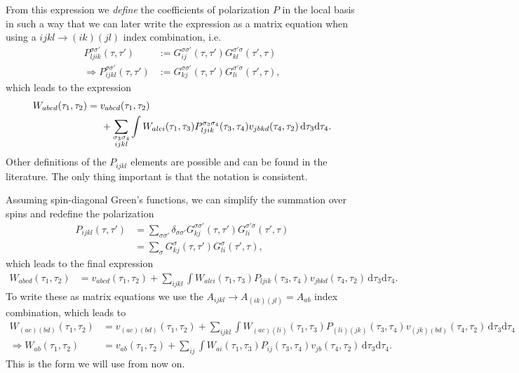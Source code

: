 \documentclass[12pt,a4paper]{scrartcl}
\numberwithin{equation}{section}
\begin{document}
From this expression we \textit{define} the coefficients of  polarization $P$ in
the local basis in such a way that we can later write the expression as a matrix
equation when using a $ijkl\rightarrow (ik)(jl)$ index combination, i.e.
\begin{align}
 P^{\sigma\sigma'}_{ljik}(\tau,\tau') 
 &:= G^{\sigma\sigma'}_{ij}(\tau,\tau') G^{\sigma'\sigma}_{kl}(\tau',\tau) \\
 \Rightarrow
 P^{\sigma\sigma'}_{ijkl}(\tau,\tau') 
 &:= G^{\sigma\sigma'}_{kj}(\tau,\tau') G^{\sigma'\sigma}_{li}(\tau',\tau) ,
\end{align}
which leads to the expression
\begin{align}
W_{abcd}(\tau_1,\tau_2) 
%
&= v_{abcd}(\tau_1,\tau_2)  \nonumber \\ 
& \hspace{0.5cm}  + \sum_{\substack{\sigma_3\sigma_4 \\ ijkl }}\int 
                     W_{alci}(\tau_1,\tau_3) 
                     P^{\sigma_3\sigma_4}_{ljik}(\tau_3,\tau_4) 
                     v_{jbkd}(\tau_4,\tau_2)
                    \, \mathrm{d}\tau_3\mathrm{d}\tau_4 .
%
\end{align}
Other definitions of the $P_{ijkl}$ elements are possible and can be found in the literature.
The only thing important is that the notation is consistent.

Assuming spin-diagonal Green's functions, we can simplify the summation
over spins and redefine the polarization
\begin{align}
 P_{ijkl}(\tau,\tau') 
 &=\sum_{\sigma\sigma'} \delta_{\sigma\sigma'}G^{\sigma\sigma'}_{kj}(\tau,\tau') G^{\sigma'\sigma}_{li}(\tau',\tau) \\
 &=\sum_{\sigma} G^{\sigma}_{kj}(\tau,\tau') G^{\sigma}_{li}(\tau',\tau) ,
\end{align}
which leads to the final expression
\begin{align}
W_{abcd}(\tau_1,\tau_2) 
%
&= v_{abcd}(\tau_1,\tau_2)   + \sum_{ijkl}\int 
                     W_{alci}(\tau_1,\tau_3) 
                     P_{ljik}(\tau_3,\tau_4) 
                     v_{jbkd}(\tau_4,\tau_2)
                    \, \mathrm{d}\tau_3\mathrm{d}\tau_4 .
%
\end{align}
To write these as matrix equations we use the $A_{ijkl}\rightarrow A_{(ik)(jl)}=A_{ab}$ index combination, which leads to
\begin{align}
W_{(ac)(bd)}(\tau_1,\tau_2) 
%
&= v_{(ac)(bd)}(\tau_1,\tau_2)   + \sum_{ijkl}\int 
                     W_{(ac)(li)}(\tau_1,\tau_3) 
                     P_{(li)(jk)}(\tau_3,\tau_4) 
                     v_{(jk)(bd)}(\tau_4,\tau_2)
                    \, \mathrm{d}\tau_3\mathrm{d}\tau_4 \\
%
\Rightarrow
W_{ab}(\tau_1,\tau_2) 
%
&= v_{ab}(\tau_1,\tau_2)   + \sum_{ij}\int 
                     W_{ai}(\tau_1,\tau_3) 
                     P_{ij}(\tau_3,\tau_4) 
                     v_{jb}(\tau_4,\tau_2)
                    \, \mathrm{d}\tau_3\mathrm{d}\tau_4 .
\end{align}
This is the form we will use from now on.
\end{document}
